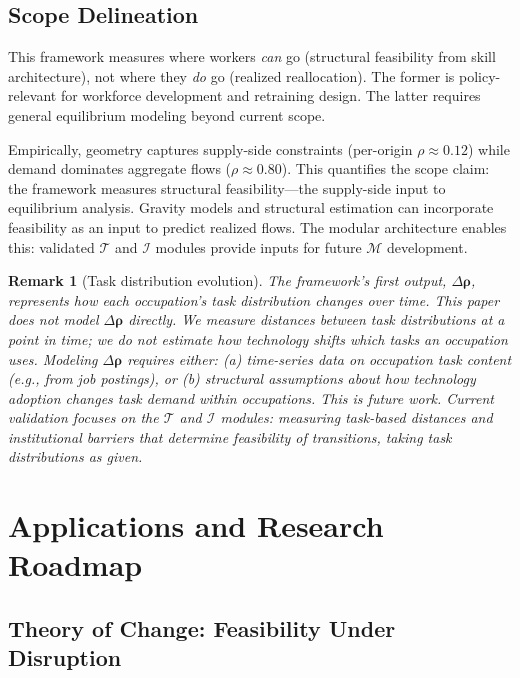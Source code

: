 \documentclass[12pt]{article}
\newtheorem{remark}[definition]{Remark}
\begin{document}
\subsection{Scope Delineation}
\label{subsec:limitation-scope}


This framework measures where workers \emph{can} go (structural feasibility from skill architecture), not where they \emph{do} go (realized reallocation). The former is policy-relevant for workforce development and retraining design. The latter requires general equilibrium modeling beyond current scope.

Empirically, geometry captures supply-side constraints (per-origin $\rho \approx 0.12$) while demand dominates aggregate flows ($\rho \approx 0.80$). This quantifies the scope claim: the framework measures structural feasibility---the supply-side input to equilibrium analysis. Gravity models and structural estimation can incorporate feasibility as an input to predict realized flows. The modular architecture enables this: validated $\mathcal{T}$ and $\mathcal{I}$ modules provide inputs for future $\mathcal{M}$ development.


\begin{remark}[Task distribution evolution]
\label{rem:task-evolution}
The framework's first output, $\Delta\boldsymbol{\rho}$, represents how each occupation's task distribution changes over time. This paper does not model $\Delta\boldsymbol{\rho}$ directly. We measure distances between task distributions at a point in time; we do not estimate how technology shifts which tasks an occupation uses. Modeling $\Delta\boldsymbol{\rho}$ requires either: (a) time-series data on occupation task content (e.g., from job postings), or (b) structural assumptions about how technology adoption changes task demand within occupations. This is future work. Current validation focuses on the $\mathcal{T}$ and $\mathcal{I}$ modules: measuring task-based distances and institutional barriers that determine feasibility of transitions, taking task distributions as given.
\end{remark}


\section{Applications and Research Roadmap}
\label{sec:applications}


\subsection{Theory of Change: Feasibility Under Disruption}
\label{subsec:theory-of-change}
\end{document}
